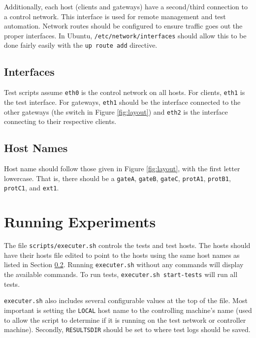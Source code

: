 \documentclass{article}
\begin{document}
\par Additionally, each host (clients and gateways) have a second/third connection to a control network. This interface is used for remote management and test automation. Network routes should be configured to ensure traffic goes out the proper interfaces. In Ubuntu, \texttt{/etc/network/interfaces} should allow this to be done fairly easily with the \texttt{up route add} directive.

\subsection{Interfaces}
\par Test scripts assume \texttt{eth0} is the control network on all hosts. For clients, \texttt{eth1} is the test interface. For gateways, \texttt{eth1} should be the interface connected to the other gateways (the switch in Figure \ref{fig:layout}) and \texttt{eth2} is the interface connecting to their respective clients.

\subsection{Host Names}
\label{sec:hostnames}
\par Host name should follow those given in Figure \ref{fig:layout}, with the first letter lowercase. That is, there should be a \texttt{gateA}, \texttt{gateB}, \texttt{gateC}, \texttt{protA1}, \texttt{protB1}, \texttt{protC1}, and \texttt{ext1}.

\section{Running Experiments}
\par The file \texttt{scripts/executer.sh} controls the tests and test hosts. The hosts should have their hosts file edited to point to the hosts using the same host names as listed in Section \ref{sec:hostnames}. Running \texttt{executer.sh} without any commands will display the available commands. To run tests, \texttt{executer.sh start-tests} will run all tests.

\par \texttt{executer.sh} also includes several configurable values at the top of the file. Most important is setting the \texttt{LOCAL} host name to the controlling machine's name (used to allow the script to determine if it is running on the test network or controller machine). Secondly, \texttt{RESULTSDIR} should be set to where test logs should be saved.
\end{document}
